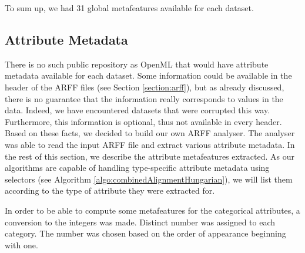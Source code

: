 To sum up, we had 31 global metafeatures available for each dataset.

\subsection{Attribute Metadata}
There is no such public repository as OpenML that would have attribute metadata available for each dataset. Some information could be available in the header of the ARFF files (see Section \ref{section:arff}), but as already discussed, there is no guarantee that the information really corresponds to values in the data. Indeed, we have encountered datasets that were corrupted this way. Furthermore, this information is optional, thus not available in every header. Based on these facts, we decided to build our own ARFF analyser. The analyser was able to read the input ARFF file and extract various attribute metadata. In the rest of this section, we describe the attribute metafeatures extracted. As our algorithms are capable of handling type-specific attribute metadata using selectors (see Algorithm \ref{algo:combinedAlignmentHungarian}), we will list them according to the type of attribute they were extracted for.

In order to be able to compute some metafeatures for the categorical attributes, a conversion to the integers was made. Distinct number was assigned to each category. The number was chosen based on the order of appearance beginning with one.

